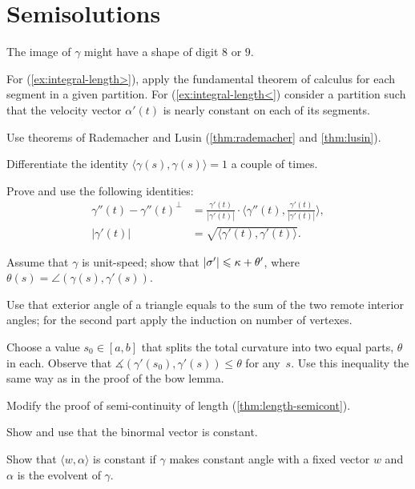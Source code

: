 \chapter{Semisolutions}

 The image of $\gamma$ might have a shape of digit $8$ or $9$.

 For (\ref{ex:integral-length>}), apply the fundamental theorem of calculus for each segment in a given partition. For (\ref{ex:integral-length<}) consider a partition such that the velocity vector $\alpha'(t)$ is nearly constant on each of its segments.

 Use theorems of Rademacher and Lusin (\ref{thm:rademacher} and \ref{thm:lusin}).

 Differentiate the identity $\langle\gamma(s),\gamma(s)\rangle=1$ a couple of times.

 Prove and use the following identities: 
\begin{align*}
\gamma''(t)-\gamma''(t)^\perp&=\tfrac{\gamma'(t)}{|\gamma'(t)|}\cdot\langle\gamma''(t),\tfrac{\gamma'(t)}{|\gamma'(t)|}\rangle,
\\
|\gamma'(t)|&=\sqrt{\langle \gamma'(t),\gamma'(t)\rangle}.\
\end{align*}

 Assume that $\gamma$ is unit-speed; show that $|\sigma'|\leqslant \kappa+\theta'$, where $\theta(s)=\angle(\gamma(s),\gamma'(s))$.

Use that exterior angle of a triangle equals to the sum of the two remote interior angles;
for the second part apply the induction on number of vertexes.

Choose a value $s_0\in[a,b]$ that splits the total curvature into two equal parts, $\theta$ in each.
Observe that $\measuredangle(\gamma'(s_0),\gamma'(s))\le \theta$ for any~$s$.
Use this inequality the same way as in the proof of the bow lemma.

 Modify the proof of semi-continuity of length (\ref{thm:length-semicont}).

Show and use that the binormal vector is constant.

Show that $\langle w,\alpha\rangle$ is constant if $\gamma$ makes constant angle with a fixed vector $w$ and $\alpha$ is the evolvent of $\gamma$.

